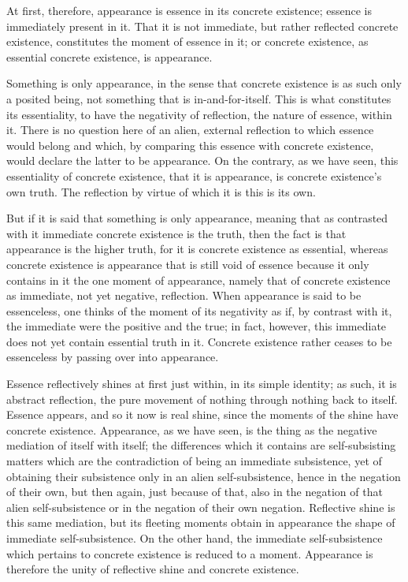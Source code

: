 At first, therefore, appearance is essence in its concrete existence;
essence is immediately present in it.
That it is not immediate, but rather reflected concrete existence,
constitutes the moment of essence in it;
or concrete existence, as essential concrete existence,
is appearance.

Something is only appearance, in the sense that
concrete existence is as such only a posited being,
not something that is in-and-for-itself.
This is what constitutes its essentiality,
to have the negativity of reflection,
the nature of essence, within it.
There is no question here of an alien,
external reflection to which essence would belong
and which, by comparing this essence with concrete existence,
would declare the latter to be appearance.
On the contrary, as we have seen, this essentiality of concrete existence,
that it is appearance, is concrete existence's own truth.
The reflection by virtue of which it is this is its own.

But if it is said that something is only appearance,
meaning that as contrasted with it immediate concrete existence is the truth,
then the fact is that appearance is the higher truth,
for it is concrete existence as essential,
whereas concrete existence is appearance that is still void of essence
because it only contains in it the one moment of appearance,
namely that of concrete existence as immediate, not yet negative, reflection.
When appearance is said to be essenceless,
one thinks of the moment of its negativity as if,
by contrast with it, the immediate were the positive and the true;
in fact, however, this immediate does not yet contain essential truth in it.
Concrete existence rather ceases to be essenceless
by passing over into appearance.

Essence reflectively shines at first just within, in its simple identity;
as such, it is abstract reflection, the pure movement
of nothing through nothing back to itself.
Essence appears, and so it now is real shine,
since the moments of the shine have concrete existence.
Appearance, as we have seen, is the thing as
the negative mediation of itself with itself;
the differences which it contains are self-subsisting matters
which are the contradiction of being an immediate subsistence,
yet of obtaining their subsistence only in an alien self-subsistence,
hence in the negation of their own, but then again,
just because of that, also in the negation of that alien self-subsistence
or in the negation of their own negation.
Reflective shine is this same mediation,
but its fleeting moments obtain in appearance
the shape of immediate self-subsistence.
On the other hand, the immediate self-subsistence which
pertains to concrete existence is reduced to a moment.
Appearance is therefore the unity
of reflective shine and concrete existence.

